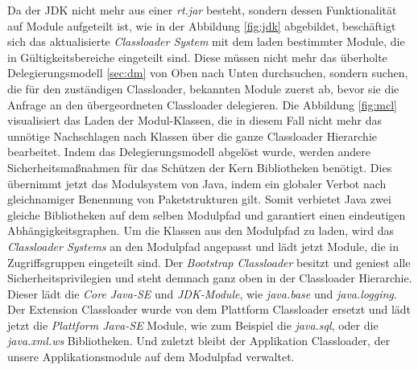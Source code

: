     Da der JDK nicht mehr aus einer \textit{rt.jar} besteht, sondern dessen Funktionalität auf Module aufgeteilt ist, wie in der Abbildung \ref{fig:jdk} abgebildet, beschäftigt sich das aktualisierte \textit{Classloader System} mit dem laden bestimmter Module, die in Gültigkeitsbereiche eingeteilt sind. Diese müssen nicht mehr das überholte Delegierungsmodell \ref{sec:dm} von Oben nach Unten durchsuchen, sondern suchen, die für den zuständigen Classloader, bekannten Module zuerst ab, bevor sie die Anfrage an den übergeordneten Classloader delegieren. Die Abbildung \ref{fig:mcl} visualisiert das Laden der Modul-Klassen, die in diesem Fall nicht mehr das unnötige Nachschlagen nach Klassen über die ganze Classloader Hierarchie bearbeitet.\newline
    Indem das Delegierungsmodell abgelöst wurde, werden andere Sicherheitsmaßnahmen für das Schützen der Kern Bibliotheken benötigt. Dies übernimmt jetzt das Modulsystem von Java, indem ein globaler Verbot nach gleichnamiger Benennung von Paketstrukturen gilt. Somit verbietet Java zwei gleiche Bibliotheken auf dem selben Modulpfad und garantiert einen eindeutigen Abhängigkeitsgraphen. \newline
    Um die Klassen aus den Modulpfad zu laden, wird das \textit{Classloader Systems} an den Modulpfad angepasst und lädt jetzt Module, die in Zugriffsgruppen eingeteilt sind. Der \textit{Bootstrap Classloader} besitzt und geniest alle Sicherheitsprivilegien und steht demnach ganz oben in der Classloader Hierarchie. Dieser lädt die \textit{Core Java-SE} und \textit{JDK-Module}, wie \textit{java.base} und \textit{java.logging}. Der Extension Classloader wurde von dem Plattform Classloader ersetzt und lädt jetzt die \textit{Plattform Java-SE} Module, wie zum Beispiel die \textit{java.sql}, oder die \textit{java.xml.ws} Bibliotheken. Und zuletzt bleibt der Applikation Classloader, der unsere Applikationsmodule auf dem Modulpfad verwaltet. \cite{classLoadingOracle,modulMitJava9,java9modRevealed}


